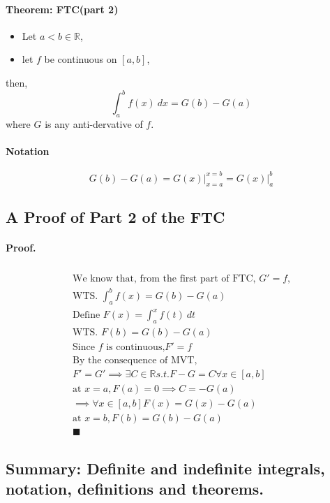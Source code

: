 \documentclass{article}
\begin{document}
	\paragraph{Theorem: FTC(part 2)}
	\begin{itemize}
		\item Let $a < b \in \mathbb{R}$,
		\item let $f$ be continuous on $[a,b]$,
	\end{itemize}
	then,
	\[
	\int_a^b{f(x)\ dx} = G(b) - G(a)
	\]
	where $G$ is any anti-dervative of $f$.
	\paragraph{Notation}
	\[
	G(b) - G(a) = G(x) \rvert _{x=a}^{x=b} = G(x) \rvert _a^b
	\]
	
	\subsection{A Proof of Part 2 of the FTC}
	\paragraph{Proof.}
	\begin{multline*}
	\\
		\text{We know that, from the first part of FTC, $G' = f$,}\\
		\text{WTS. } \int_a^b{f(x)} = G(b) - G(a) \\
		\text{Define } F(x) = \int_a^x{f(t)\ dt} \\
		\text{WTS. }F(b) = G(b) - G(a) \\
		\text{Since $f$ is continuous,} F' = f \\
		\text{By the consequence of MVT,} \\
		F' = G' \implies \exists C \in \mathbb{R} s.t. F - G = C \forall x \in [a,b] \\
		\text{at } x = a, F(a) = 0 \implies C = -G(a)\\
		\implies \forall x \in [a,b] F(x) = G(x) - G(a) \\
		\text{at } x = b, F(b) = G(b) - G(a) \\
		\blacksquare
	\end{multline*}
	
	\subsection{Summary: Definite and indefinite integrals, notation, definitions and theorems.}
\end{document}
